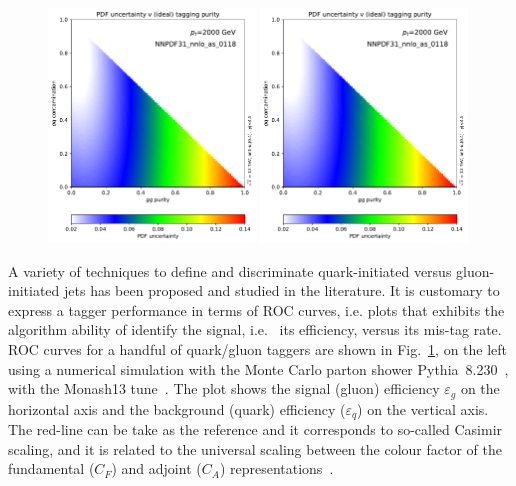 \begin{figure}
\begin{center}
\includegraphics[width=0.49\textwidth, page=4]{figs/performance-plots.pdf} \hfill
\includegraphics[width=0.49\textwidth, page=5]{figs/performance-plots.pdf}
\caption{}
\label{fig:performance_studies} 
\end{center}
\end{figure}
A variety of techniques to define and discriminate quark-initiated versus gluon-initiated jets has been proposed and studied in the literature. It is customary to express a tagger performance in terms of ROC curves, i.e. plots that exhibits the algorithm ability of identify the signal, i.e. \ its efficiency, versus its mis-tag rate. ROC curves for a handful of quark/gluon taggers are shown in Fig.~\ref{fig:performance_studies}, on the left using a numerical simulation with the Monte Carlo parton shower Pythia~8.230~\cite{}, with the Monash13 tune~\cite{}. The plot shows the signal (gluon) efficiency $\varepsilon_g$ on the horizontal axis and the background (quark) efficiency ($\varepsilon_q$) on the vertical axis. The red-line can be take as the reference and it corresponds to so-called Casimir scaling, and it is related to the universal scaling between the colour factor of the fundamental ($C_F$) and adjoint ($C_A$) representations~\cite{}. 

